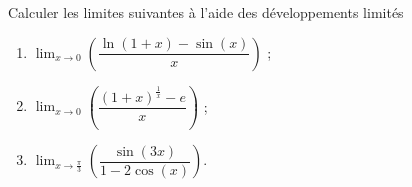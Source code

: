 
\begin{exercice}\label{exoautoanalyseCTU-51}

 Calculer les limites suivantes à l'aide des développements limités
   \begin{enumerate}
   \item $\displaystyle \lim_{x\to 0}\left(\dfrac{\ln(1+x)-\sin (x)}{x}\right)$ ;
   \item $\displaystyle \lim_{x\to 0}\left(\dfrac{(1+x)^{\frac{1}{x}}-e}{x}\right)$ ; 
   \item $\displaystyle \lim_{x\to \frac{\pi}{3}}\left(\dfrac{\sin (3x)}{1-2\cos (x)}\right)$.
   \end{enumerate}



\end{exercice}
